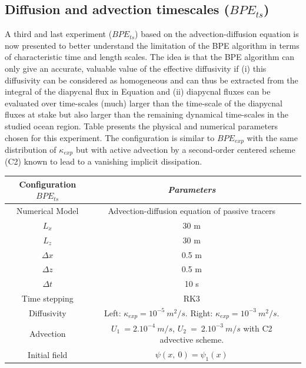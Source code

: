 \subsection{Diffusion and advection timescales ($BPE_{ts}$)}
A third and last experiment ($BPE_{ts}$) based on the advection-diffusion equation  is now presented to better understand the limitation of the BPE algorithm in terms of characteristic time and length scales. The idea is that the BPE algorithm can only give an accurate, valuable value of the effective diffusivity if (i) this diffusivity can be considered as homogeneous and can thus be extracted from the integral of the diapycnal flux in Equation  and (ii) diapycnal fluxes can be evaluated over time-scales (much) larger than the time-scale of the diapycnal fluxes at stake but also larger than the remaining dynamical time-scales in the studied ocean region.
Table  presents the physical and numerical parameters chosen for this experiment. The configuration is similar to $BPE_{exp}$ with the same distribution of $\kappa_{exp}$ but with active advection by a second-order centered scheme (C2) known to lead to a vanishing implicit dissipation.
\begin{table}[h]
        \centering
        \begin{tabular}{|c|c|c|}
                \hline
                Configuration $BPE_{ts}$ & \textit{Parameters}\\
                \hline 
                Numerical Model & Advection-diffusion equation of passive tracers\\
                $L_x$ & 30 m\\
                $L_z$ & 30 m\\
                $\Delta x$ & 0.5 m\\
                $\Delta z$ & 0.5 m\\
                $\Delta t$ & 10 s\\
                Time stepping & RK3 \\
                Diffusivity & Left: $\kappa_{exp} = 10^{-5} \ m^2/s$. Right: $\kappa_{exp} = 10^{-3} \ m^2/s$.\\
                Advection & $U_1\ = 2.10^{-4}\ m/s$, $U_2\ =\ 2.10^{-3}\ m/s$ with C2 advective scheme.\\
                Initial field & $\psi(x,\ 0)=\psi_1(x)$\\
                \hline
        \end{tabular}
        \label{tab_NUMLAB_ts}
\end{table}

